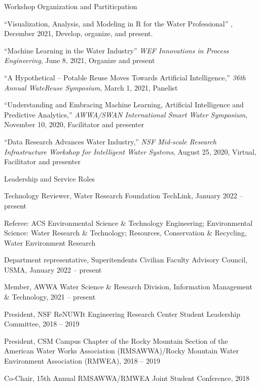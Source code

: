 \documentclass{resume} %
\begin{document}

\begin{rSection}{Workshop Organization and Partiticpation}

``Visualization, Analysis, and Modeling in R for the Water Professional'' , December 2021, Develop, organize, and present.

``Machine Learning in the Water Industry'' \emph{WEF Innovations in Process Engineering}, June 8, 2021, Organize and present

``A Hypothetical – Potable Reuse Moves Towards Artificial Intelligence,'' \emph{36th Annual WateReuse Symposium}, March 1, 2021, Panelist

``Understanding and Embracing Machine Learning, Artificial Intelligence and Predictive Analytics,'' \emph{AWWA/SWAN International Smart Water Symposium}, November 10, 2020, Facilitator and presenter

``Data Research Advances Water Industry,'' \emph{NSF Mid-scale Research Infrastructure Workshop for Intelligent Water Systems}, August 25, 2020, Virtual, Facilitator and presenter

\end{rSection}

\newpage


\begin{rSection}{Leadership and Service Roles}

Technology Reviewer, Water Research Foundation TechLink, January 2022 – present

Referee: ACS Environmental Science \& Technology Engineering; Environmental Science: Water Research \& Technology; Resources, Conservation \& Recycling, Water Environment Research

Department representative, Superitendents Civilian Faculty Advisory Council, USMA, January 2022 – present

Member, AWWA Water Science \& Research Division, Information Management \& Technology, 2021 – present

President, NSF ReNUWIt Engineering Research Center Student Leadership Committee, 2018 – 2019

President, CSM Campus Chapter of the Rocky Mountain Section of the American Water Works Association (RMSAWWA)/Rocky Mountain Water Environment Association (RMWEA), 2018 – 2019

Co-Chair, 15th Annual RMSAWWA/RMWEA Joint Student Conference, 2018

\end{rSection}
\end{document}
